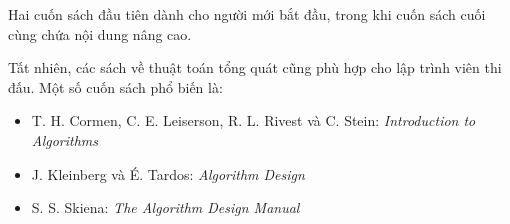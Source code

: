 Hai cuốn sách đầu tiên dành cho người mới bắt đầu,
trong khi cuốn sách cuối cùng chứa nội dung nâng cao.

Tất nhiên, các sách về thuật toán tổng quát cũng phù hợp cho
lập trình viên thi đấu.
Một số cuốn sách phổ biến là:

\begin{itemize}
\item T. H. Cormen, C. E. Leiserson, R. L. Rivest và C. Stein:
\emph{Introduction to Algorithms} \cite{cor09}
\item J. Kleinberg và É. Tardos:
\emph{Algorithm Design} \cite{kle05}
\item S. S. Skiena:
\emph{The Algorithm Design Manual} \cite{ski08}
\end{itemize}
